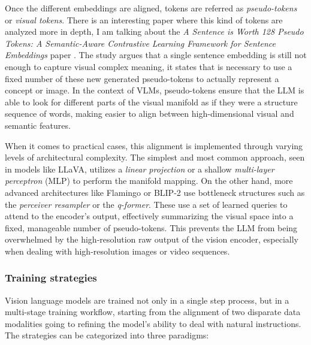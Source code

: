 Once the different embeddings are aligned, tokens are referred as \textit{pseudo-tokens} or \textit{visual tokens}. There is an interesting paper where this kind of tokens are analyzed more in depth, I am talking about the \textit{A Sentence is Worth 128 Pseudo Tokens: A Semantic-Aware Contrastive Learning Framework for Sentence Embeddings
} paper \cite{tan2022sentenceworth128pseudo}. The study argues that a single sentence embedding is still not enough to capture visual complex meaning, it states that is necessary to use a fixed number of these new generated pseudo-tokens to actually represent a concept or image. In the context of VLMs, pseudo-tokens ensure that the LLM is able to look for different parts of the visual manifold as if they were a structure sequence of words, making easier to align between high-dimensional visual and semantic features. 

When it comes to practical cases, this alignment is implemented through varying levels of architectural complexity. The simplest and most common approach, seen in models like LLaVA, utilizes a \textit{linear projection} or a shallow \textit{multi-layer perceptron} (MLP) to perform the manifold mapping. On the other hand, more advanced architectures like Flamingo or BLIP-2 use bottleneck structures such as the \textit{perceiver resampler} or the \textit{q-former}. These use a set of learned queries to attend to the encoder's output, effectively summarizing the visual space into a fixed, manageable number of pseudo-tokens. This prevents the LLM from being overwhelmed by the high-resolution raw output of the vision encoder, especially when dealing with high-resolution images or video sequences.

\subsubsection{Training strategies}
Vision language models are trained not only in a single step process, but in a multi-stage training workflow, starting from the alignment of two disparate data modalities going to refining the model's ability to deal with natural instructions. The strategies can be categorized into three paradigms:

